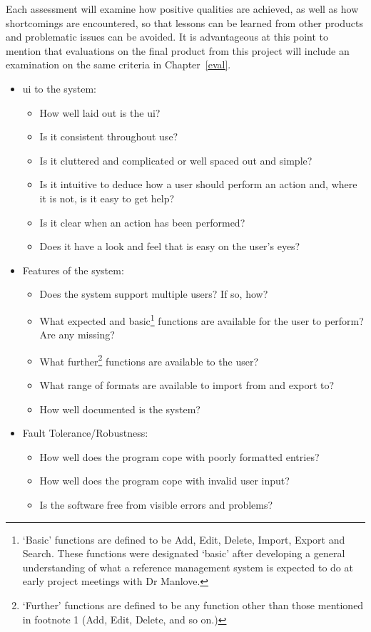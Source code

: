 Each assessment will examine how positive qualities are achieved, as well as how shortcomings are encountered, so that lessons can be learned from other products and problematic issues can be avoided.  It is advantageous at this point to mention that evaluations on the final product from this project will include an examination on the same criteria in Chapter~\ref{eval}.
\begin{itemize}
	\item \gls{ui} to the system:
	\begin{itemize}
		\item How well laid out is the \gls{ui}? 
		\item Is it consistent throughout use?
		\item Is it cluttered and complicated or well spaced out and simple?
		\item Is it intuitive to deduce how a user should perform an action and, where it is not, is it easy to get help?
		\item Is it clear when an action has been performed?
		\item Does it have a look and feel that is easy on the user's eyes?
	\end{itemize}
	\item Features of the system:
	\begin{itemize}
		\item Does the system support multiple users? If so, how?
		\item What expected and basic\footnote{`Basic' functions are defined to be Add, Edit, Delete, Import, Export and Search. These functions were designated `basic' after developing a general understanding of what a reference management system is expected to do at early project meetings with Dr Manlove.} functions are available for the user to perform? Are any missing?  %
		\item What further\footnote{`Further' functions are defined to be any function other than those mentioned in footnote 1 (Add, Edit, Delete, and so on.)} functions are available to the user? 
		\item What range of formats are available to import from and export to?
		\item How well documented is the system?
	\end{itemize}
	\item Fault Tolerance/Robustness:
	\begin{itemize}
		\item How well does the program cope with poorly formatted entries?
		\item How well does the program cope with invalid user input?
		\item Is the software free from visible errors and problems?
	\end{itemize}
\end{itemize}

